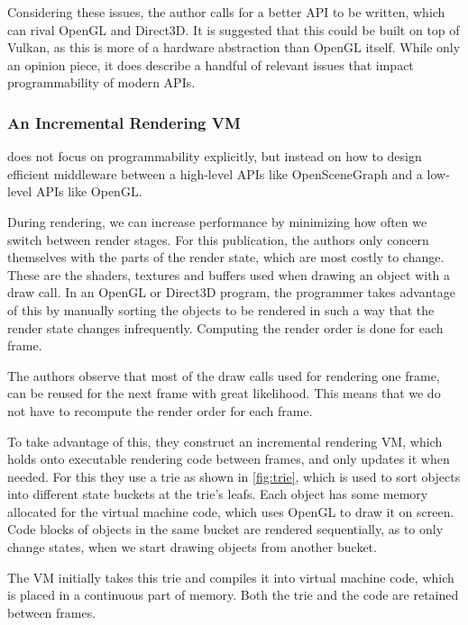  
Considering these issues, the author calls for a better \gls{API} to be written, which can rival OpenGL and Direct3D.
It is suggested that this could be built on top of Vulkan, as this is more of a hardware abstraction than OpenGL itself.
While only an opinion piece, it does describe a handful of relevant issues that impact programmability of modern \glspl{API}.


\subsubsection{An Incremental Rendering VM} 
\citet{haaser_2015_incremental} does not focus on programmability explicitly, but instead on how to design efficient middleware between a high-level \glspl{API} like OpenSceneGraph and a low-level \glspl{API} like OpenGL. 


During rendering, we can increase performance by minimizing how often we switch between render stages.
For this publication, the authors only concern themselves with the parts of the render state, which are most costly to change.
These are the shaders, textures and buffers used when drawing an object with a draw call.
In an OpenGL or Direct3D program, the programmer takes advantage of this by manually sorting the objects to be rendered in such a way that the render state changes infrequently.
Computing the render order is done for each frame. 


The authors observe that most of the draw calls used for rendering one frame, can be reused for the next frame with great likelihood.
This means that we do not have to recompute the render order for each frame. 


To take advantage of this, they construct an incremental rendering \gls{VM}, which holds onto executable rendering code between frames, and only updates it when needed.
For this they use a trie as shown in \cref{fig:trie}, which is used to sort objects into different state buckets at the trie’s leafs.
Each object has some memory allocated for the virtual machine code, which uses OpenGL to draw it on screen. 
Code blocks of objects in the same bucket are rendered sequentially, as to only change states, when we start drawing objects from another bucket. 


The \gls{VM} initially takes this trie and compiles it into virtual machine code, which is placed in a continuous part of memory.
Both the trie and the code are retained between frames. 


